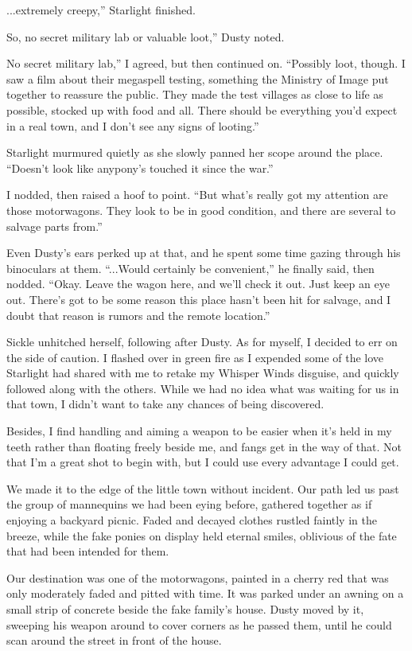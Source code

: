 \leavevmode{}...extremely creepy,” Starlight finished.

\leavevmode{}So, no secret military lab or valuable loot,” Dusty noted.

\leavevmode{}No secret military lab,” I agreed, but then continued on. “Possibly loot, though. I saw a film about their megaspell testing, something the Ministry of Image put together to reassure the public. They made the test villages as close to life as possible, stocked up with food and all. There should be everything you’d expect in a real town, and I don’t see any signs of looting.”

Starlight murmured quietly as she slowly panned her scope around the place. “Doesn’t look like anypony’s touched it since the war.”

I nodded, then raised a hoof to point. “But what’s really got my attention are those motorwagons. They look to be in good condition, and there are several to salvage parts from.”

Even Dusty’s ears perked up at that, and he spent some time gazing through his binoculars at them. “...Would certainly be convenient,” he finally said, then nodded. “Okay. Leave the wagon here, and we’ll check it out. Just keep an eye out. There’s got to be some reason this place hasn’t been hit for salvage, and I doubt that reason is rumors and the remote location.”

Sickle unhitched herself, following after Dusty. As for myself, I decided to err on the side of caution. I flashed over in green fire as I expended some of the love Starlight had shared with me to retake my Whisper Winds disguise, and quickly followed along with the others. While we had no idea what was waiting for us in that town, I didn’t want to take any chances of being discovered.

Besides, I find handling and aiming a weapon to be easier when it’s held in my teeth rather than floating freely beside me, and fangs get in the way of that. Not that I’m a great shot to begin with, but I could use every advantage I could get.

We made it to the edge of the little town without incident. Our path led us past the group of mannequins we had been eying before, gathered together as if enjoying a backyard picnic. Faded and decayed clothes rustled faintly in the breeze, while the fake ponies on display held eternal smiles, oblivious of the fate that had been intended for them.

Our destination was one of the motorwagons, painted in a cherry red that was only moderately faded and pitted with time. It was parked under an awning on a small strip of concrete beside the fake family’s house. Dusty moved by it, sweeping his weapon around to cover corners as he passed them, until he could scan around the street in front of the house.


